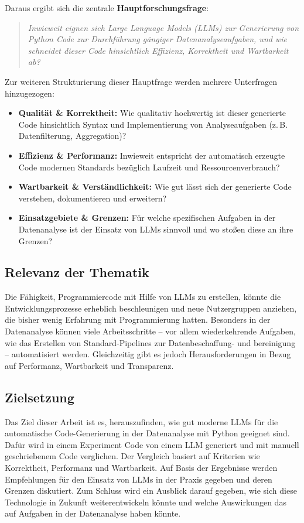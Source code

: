 \documentclass[11pt,a4paper]{article}
\begin{document}
Daraus ergibt sich die zentrale \textbf{Hauptforschungsfrage}:

\begin{quote}
    \emph{Inwieweit eignen sich Large Language Models (LLMs) zur Generierung von Python Code zur Durchführung gängiger Datenanalyseaufgaben, und wie schneidet dieser Code hinsichtlich Effizienz, Korrektheit und Wartbarkeit ab?}
\end{quote}

Zur weiteren Strukturierung dieser Hauptfrage werden mehrere Unterfragen hinzugezogen:
\begin{itemize}
    \item \textbf{Qualität \& Korrektheit:} Wie qualitativ hochwertig ist dieser generierte Code hinsichtlich Syntax und Implementierung von Analyseaufgaben (z.\,B. Datenfilterung, Aggregation)?
    \item \textbf{Effizienz \& Performanz:} Inwieweit entspricht der automatisch erzeugte Code modernen Standards bezüglich Laufzeit und Ressourcenverbrauch?
    \item \textbf{Wartbarkeit \& Verständlichkeit:} Wie gut lässt sich der generierte Code verstehen, dokumentieren und erweitern?
    \item \textbf{Einsatzgebiete \& Grenzen:} Für welche spezifischen Aufgaben in der Datenanalyse ist der Einsatz von LLMs sinnvoll und wo stoßen diese an ihre Grenzen?
\end{itemize}

\subsection{Relevanz der Thematik}
Die Fähigkeit, Programmiercode mit Hilfe von LLMs zu erstellen, könnte die Entwicklungsprozesse erheblich beschleunigen und neue Nutzergruppen anziehen, die bisher wenig Erfahrung mit Programmierung hatten. Besonders in der Datenanalyse können viele Arbeitsschritte – vor allem wiederkehrende Aufgaben, wie das Erstellen von Standard-Pipelines zur Datenbeschaffung- und bereinigung – automatisiert werden. Gleichzeitig gibt es jedoch Herausforderungen in Bezug auf Performanz, Wartbarkeit und Transparenz.

\subsection{Zielsetzung}
Das Ziel dieser Arbeit ist es, herauszufinden, wie gut moderne LLMs für die automatische Code-Generierung in der Datenanalyse mit Python geeignet sind. Dafür wird in einem Experiment Code von einem LLM generiert und mit manuell geschriebenem Code verglichen. Der Vergleich basiert auf Kriterien wie Korrektheit, Performanz und Wartbarkeit. Auf Basis der Ergebnisse werden Empfehlungen für den Einsatz von LLMs in der Praxis gegeben und deren Grenzen diskutiert. Zum Schluss wird ein Ausblick darauf gegeben, wie sich diese Technologie in Zukunft weiterentwickeln könnte und welche Auswirkungen das auf Aufgaben in der Datenanalyse haben könnte.
\end{document}
